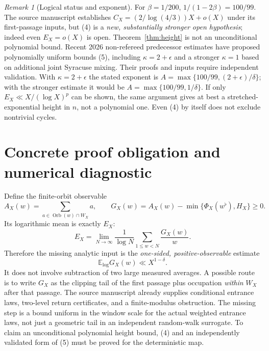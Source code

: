 \documentclass[11pt]{amsart}
\theoremstyle{remark}
\newtheorem{remark}{Remark}
\newcommand{\Orb}{\operatorname{Orb}}
\begin{document}
\begin{remark}[Logical status and exponent]
For $\beta=1/200$, $1/(1-2\beta)=100/99$. The source manuscript
establishes $C_X=(2/\log(4/3))X+o(X)$ under its first-passage inputs,
but (4) is a \emph{new, substantially stronger open hypothesis};
indeed even $E_X=o(X)$ is open. Theorem~\ref{thm:height} is not an
unconditional polynomial bound. Recent 2026 non-refereed predecessor
estimates have proposed polynomially uniform bounds (5), including
$\kappa=2+\epsilon$ and a stronger $\kappa=1$ based on additional
joint Syracuse mixing. Their proofs and inputs require independent
validation. With $\kappa=2+\epsilon$ the stated exponent is
$A=\max\{100/99,(2+\epsilon)/\delta\}$; with the stronger estimate
it would be $A=\max\{100/99,1/\delta\}$.
If only $E_X\ll X/(\log X)^p$ can be shown, the same argument gives
at best a stretched-exponential height in $n$, not a polynomial one.
Even (4) by itself does not exclude nontrivial cycles.
\end{remark}

\section{Concrete proof obligation and numerical diagnostic}
Define the finite-orbit observable
\[
A_X(w)=\sum_{a\in\Orb(w)\cap W_X}a,
\qquad
G_X(w)=A_X(w)-\min\{\Phi_X(w^\flat),H_X\}\ge0.
\]
Its logarithmic mean is exactly $E_X$:
\[
E_X=\lim_{N\to\infty}\frac1{\log N}
   \sum_{1\le w<N}\frac{G_X(w)}w.
\]
Therefore the missing analytic input is the \emph{one-sided,
positive-observable} estimate
\[
\boxed{\mathbb E_{\log}G_X(w)\ll X^{1-\delta}}.
\]
It does not involve subtraction of two large measured averages.
A possible route is to write $G_X$ as the clipping tail of the first
passage plus occupation \emph{within} $W_X$ after that passage.
The source manuscript already supplies conditional entrance laws,
two-level return certificates, and a finite-modulus obstruction.
The missing step is a bound uniform in the window scale for the
actual weighted entrance laws, not just a geometric tail in an
independent random-walk surrogate. To claim an unconditional
polynomial height bound, (4) and an independently validated form of
(5) must be proved for the deterministic map.
\end{document}

